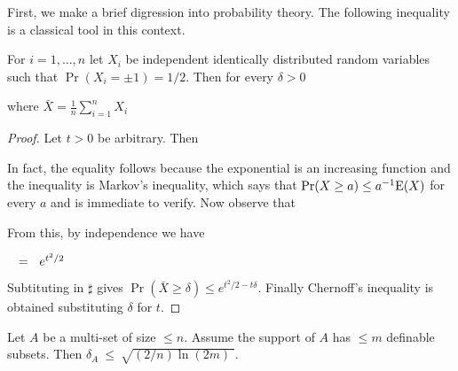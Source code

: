 \documentclass[combinatorics.tex]{subfiles}
\begin{document}
First, we make a brief digression into probability theory.
The following inequality is a classical tool in this context.

\begin{lemma}\label{Chernoff}
For $i=1,\dots,n$ let $X_i$ be independent identically distributed random variables such that $\Pr(X_i=\pm1)=1/2$.
Then for every $\delta>0$

\hfill where $\displaystyle \bar X=\frac1n\sum^n_{i=1}X_i$
\end{lemma}
\begin{proof}
Let $t>0$ be arbitrary.
Then



In fact, the equality follows because the exponential is an increasing function and the inequality is Markov's inequality, which says that $\Pr(X\ge a)\le a^{-1}{\rm E}(X)$ for every $a$ and is immediate to verify.
Now observe that






From this, by independence we have 

$\medrel{=}e^{t^2/2}$


Subtituting in $\sharp$ gives $\Pr(\bar X\ge\delta)\le e^{t^2/2-t\delta}$.
Finally Chernoff's inequality is obtained substituting $\delta$ for $t$.
\end{proof}


\begin{lemma}\label{lem_discrepanzarandom} 
Let $A$ be a multi-set of size $\le n$. Assume the support of $A$ has $\le m$  definable subsets. Then $\delta_A\ \le\ \sqrt{(2/n)\ln(2m)\;}$.
\end{lemma}
\end{document}
